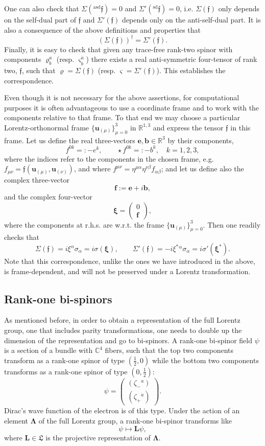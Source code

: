 \documentclass[12pt]{article}
\theoremstyle{definition}
\numberwithin{equation}{section}
\newcommand{\ff}{\mathfrak{f}}
\newcommand{\bb}{\mathbf{b}}
\newcommand{\be}{\mathbf{e}}
\newcommand{\beff}{\mathbf{f}}
\newcommand{\bff}{\boldsymbol{\ff}}
\newcommand{\bL}{\mathbf{L}}
\newcommand{\bu}{\mathbf{u}}
\newcommand{\beq}{\begin{equation}}
\newcommand{\eeq}{\end{equation}}
\newcommand{\fL}{\mathfrak{L}}
\newcommand{\xiV}{{\boldsymbol{\xi}}}
\newcommand{\bLa}{\boldsymbol{\Lambda}}
\newcommand{\Cset}{{\mathbb C}}
\newcommand{\Rset}{{\mathbb R}}
\newcommand{\al}{\alpha}
\newcommand{\si}{\sigma}
\newcommand{\Si}{\Sigma}
\newcommand{\half}{\frac{1}{2}}
\newcommand{\sdf}{{}^{\mathrm{sd}}\bff}
\newcommand{\asdf}{{}^{\mathrm{asd}}\bff}
\begin{document}
 One can also check that $\Si(\asdf) = 0$ and $\Si'(\sdf) = 0$, i.e. $\Si(\bff)$ only depends on the self-dual part of $\bff$ and 
$\Si'(\bff)$ depends only on the anti-self-dual part.  
It is also a consequence of the above definitions and properties that 
\beq 
\left( \Si(\bff)\right)^\dag = \Si'(\bff).
\eeq
 Finally, it is easy to 
check that given any trace-free rank-two spinor with components $\varrho^a_b$ (resp. $\varsigma^{\dot{a}}_{\dot{b}}$) there 
exists a real anti-symmetric four-tensor of rank two, $\bff$, such that $\varrho = \Si(\bff)$ (resp. $\varsigma = \Si'(\bff)$). 
 This establishes the correspondence.

 Even though it is not necessary for the above assertions, for computational purposes it is often advantageous to use a coordinate 
frame and to work with the components relative to that frame. 
 To that end we may choose a particular Lorentz-orthonormal frame $\{\bu_{(\mu)}\}_{\mu = 0}^3$ in $\Rset^{1,3}$ and express the tensor 
$\bff$ in this frame. 
 Let us define the real three-vectors $\be,\bb \in \Rset^3$ by their components,
\beq \label{defeb}
f^{0k} =: -e^k,\qquad \star{f}^{0k} =: -b^k,\quad k=1,2,3, 
\eeq
where the indices refer to the components in the chosen frame, e.g. $f_{\mu\nu} = \bff(\bu_{(\mu)},\bu_{(\nu)})$, and where
$f^{\mu\nu} = \eta^{\mu\al}\eta^{\nu\beta} f_{\al\beta}$; and let us define also the complex three-vector
\beq  
\beff := \be + i \bb, 
\eeq
and the complex four-vector
\beq 
\xiV = \begin{pmatrix} 0 \\  \beff \end{pmatrix},
\eeq
where the components at r.h.s. are w.r.t. the frame $\{\bu_{(\mu)}\}_{\mu = 0}^3$.
 Then one readily checks that
\beq 
\Si(\bff) = i\xi^\al\si_\al = i\si(\xiV),\qquad \Si'(\bff) = -i\xi^\ast{}^\al \si_\al=i\si'(\xiV^\ast).
\eeq
 Note that this correspondence, unlike the ones we have introduced in the above, is frame-dependent, and will not be preserved under a 
Lorentz transformation.



\subsection{Rank-one bi-spinors}

 As mentioned before, in order to obtain a representation of the full Lorentz group, one that includes parity transformations, 
one needs to double up the dimension of the representation and go to bi-spinors.  
A rank-one bi-spinor field $\psi$ is a section of a  bundle with $\Cset^4$ fibers, such that the top two components transform as a 
rank-one spinor of type $(\half,0)$ while the bottom two components transforms as a rank-one spinor of type $(0,\half)$:
\beq 
\psi = \left( \begin{array}{c} (\zeta_-{}^a) \\ (\zeta_+{}^{\dot{a}}) \end{array}\right).
\eeq
 Dirac's wave function of the electron is of this type. 
 Under the action of an element $\bLa$ of the full Lorentz group, a rank-one bi-spinor transforms like
\beq  
\psi \mapsto \bL \psi ,
\eeq
where $\bL \in \fL$ is the projective representation of $\bLa$.  
\end{document}
